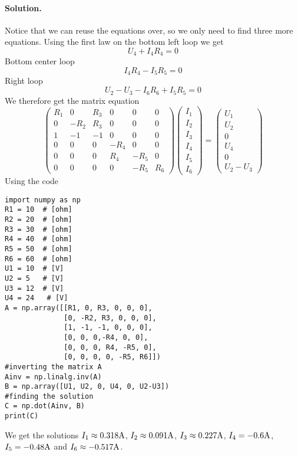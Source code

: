 \documentclass[%
oneside,                 %
final,                   %
10pt]{article}
\newenvironment{doconceexercise}{}{}
\begin{document}
\begin{doconceexercise}
\paragraph{Solution.}
Notice that we can reuse the equations over, so we only need to find three more equations. Using the first law on the bottom left loop we get
\begin{equation}
U_4 + I_4R_4 = 0
\end{equation}
Bottom center loop
\begin{equation}
I_4R_4 - I_5R_5 = 0
\end{equation}
Right loop
\begin{equation}
U_2 - U_3 - I_6R_6 + I_5R_5 = 0
\end{equation}
We therefore get the matrix equation
\begin{equation}
\left( \begin{matrix} R_1 & 0 & R_3 & 0 & 0 & 0 \\ 0 & -R_2 & R_3 & 0 & 0 & 0 \\ 1 & -1 & -1 & 0 & 0 & 0 \\ 0 & 0 & 0 & -R_4 & 0 & 0 \\ 0 & 0 & 0 & R_4 & -R_5 & 0\\ 0 & 0 & 0 & 0 & -R_5 & R_6 \end{matrix}\right) \left(\begin{matrix}I_1 \\ I_2 \\ I_3 \\ I_4 \\ I_5 \\ I_6\end{matrix}\right) =\left(\begin{matrix}U_1 \\ U_2 \\ 0 \\ U_4 \\ 0 \\ U_2 - U_3 \end{matrix}\right)
\end{equation}
Using the code
\begin{verbatim}
import numpy as np
R1 = 10  # [ohm]
R2 = 20  # [ohm]
R3 = 30  # [ohm]
R4 = 40  # [ohm]
R5 = 50  # [ohm]
R6 = 60  # [ohm]
U1 = 10  # [V]
U2 = 5   # [V]
U3 = 12  # [V]
U4 = 24   # [V]
A = np.array([[R1, 0, R3, 0, 0, 0], 
              [0, -R2, R3, 0, 0, 0], 
              [1, -1, -1, 0, 0, 0],
              [0, 0, 0,-R4, 0, 0], 
              [0, 0, 0, R4, -R5, 0], 
              [0, 0, 0, 0, -R5, R6]])
#inverting the matrix A
Ainv = np.linalg.inv(A)
B = np.array([U1, U2, 0, U4, 0, U2-U3])
#finding the solution
C = np.dot(Ainv, B)
print(C)
\end{verbatim}
We get the solutions $I_1 \approx 0.318\rm{A}$, $I_2 \approx 0.091\rm{A}$, $I_3 \approx 0.227\rm{A}$, $I_4 = -0.6\rm{A}$, $I_5 = -0.48\rm{A}$ and $I_6 \approx -0.517\rm{A}$.


\end{doconceexercise}



\end{document}
